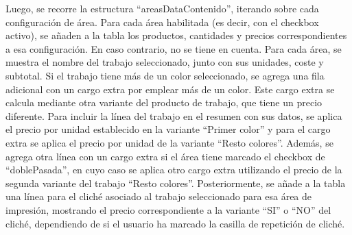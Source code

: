 \documentclass[12pt]{article}
\begin{document}
Luego, se recorre la estructura ``areasDataContenido'', iterando sobre cada configuración de área. Para cada área habilitada 
(es decir, con el checkbox activo), se añaden a la tabla los productos, cantidades y precios correspondientes a esa configuración.
En caso contrario, no se tiene en cuenta. Para cada área, se muestra el nombre del trabajo seleccionado, junto con sus unidades, 
coste y subtotal. Si el trabajo tiene más de un color seleccionado, se agrega una fila adicional con un cargo extra por emplear 
más de un color. Este cargo extra se calcula mediante otra variante del producto de trabajo, que tiene un precio diferente. 
Para incluir la línea del trabajo en el resumen con sus datos, se aplica el precio por unidad establecido en la variante 
``Primer color'' y para el cargo extra se aplica el precio por unidad de la variante ``Resto colores''. Además, 
se agrega otra línea con un cargo extra si el área tiene marcado el checkbox de ``doblePasada'', en cuyo caso se aplica 
otro cargo extra utilizando el precio de la segunda variante del trabajo ``Resto colores''. Posteriormente, se añade a la tabla 
una línea para el cliché asociado al trabajo seleccionado para esa área de impresión, mostrando el precio correspondiente a la 
variante ``SI'' o ``NO'' del cliché, dependiendo de si el usuario ha marcado la casilla de repetición de cliché.
\end{document}
